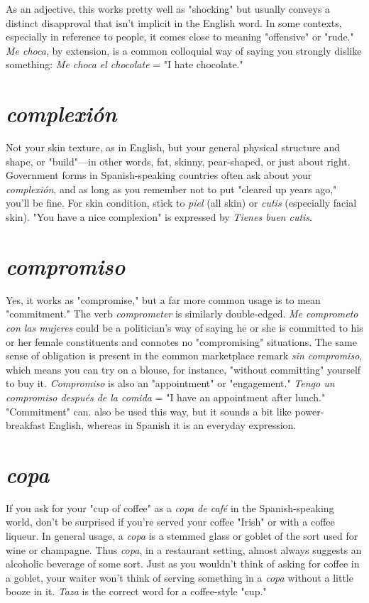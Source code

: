 \documentclass[14pt,a4paper,oneside]{memoir}
\begin{document}
As an adjective, this works pretty well as
"shocking" but usually conveys a distinct disapproval that isn't implicit in the English word. In some contexts, especially in reference to
people, it comes close to meaning "offensive" or "rude." \emph{Me choca}, by
extension, is a common colloquial way of saying you strongly dislike
something: \emph{Me choca el chocolate} = "I hate chocolate."

\section{\emph{complexión}}

Not your skin texture, as in English, but your
general physical structure and shape, or "build"---in other words, fat,
skinny, pear-shaped, or just about right. Government forms in Spanish-speaking countries often ask about your \emph{complexión}, and as long as
you remember not to put "cleared up years ago," you'll be fine. For
skin condition, stick to \emph{piel} (all skin) or \emph{cutis} (especially facial skin).
"You have a nice complexion" is expressed by \emph{Tienes buen cutis}.

\section{\emph{compromiso}}

Yes, it works as "compromise," but a far more
common usage is to mean "commitment." The verb \emph{comprometer} is
similarly double-edged. \emph{Me comprometo con las mujeres} could be a
politician's way of saying he or she is committed to his or her female
constituents and connotes no "compromising" situations. The same
sense of obligation is present in the common marketplace remark
\emph{sin compromiso}, which means you can try on a blouse, for instance,
"without committing" yourself to buy it. \emph{Compromiso} is also an
"appointment" or "engagement." \emph{Tengo un compromiso después de la
	comida} = "I have an appointment after lunch." "Commitment" can.
also be used this way, but it sounds a bit like power-breakfast English,
whereas in Spanish it is an everyday expression.

\section{\emph{copa}}

If you ask for your "cup of coffee" as a \emph{copa de café} in
the Spanish-speaking world, don't be surprised if you're served your
coffee "Irish" or with a coffee liqueur. In general usage, a \emph{copa} is a
stemmed glass or goblet of the sort used for wine or champagne. Thus
\emph{copa}, in a restaurant setting, almost always suggests an alcoholic beverage of some sort. Just as you wouldn't think of asking for coffee in a
goblet, your waiter won't think of serving something in a \emph{copa} without
a little booze in it. \emph{Taza} is the correct word for a coffee-style "cup."
\end{document}
